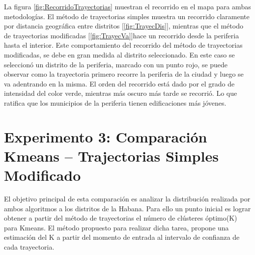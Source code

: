 La figura \ref{fig:RecorridoTrayectorias}  muestran el recorrido en el mapa para ambas metodologías. El método de trayectorias simples muestra un recorrido claramente por distancia geográfica entre distritos [\ref{fig:TrayecDis}], mientras que el método de trayectorias modificadas [\ref{fig:TrayecVa}]hace un recorrido desde la periferia hasta el interior. Este comportamiento del recorrido del método de trayectorias modificadas, se debe en gran medida al distrito seleccionado. En este caso se seleccionó un distrito de la periferia, marcado con un punto rojo, se puede observar como la trayectoria primero recorre la periferia de la ciudad y luego se va adentrando en la misma. El orden del recorrido está dado por el grado de intensidad del color verde, mientras más oscuro más tarde se recorrió. Lo que ratifica que los municipios de la periferia tienen edificaciones más jóvenes.

\section{Experimento 3: Comparación Kmeans – Trajectorias Simples Modificado}
El objetivo principal de esta comparación es analizar la distribución realizada por ambos algoritmos a los distritos de la Habana. Para ello un punto inicial es lograr obtener a partir del método de trayectorias el número de clústeres óptimo(K) para Kmeans. El método propuesto para realizar dicha tarea, propone una estimación del K a partir del momento de entrada al intervalo de confianza de cada trayectoria.

